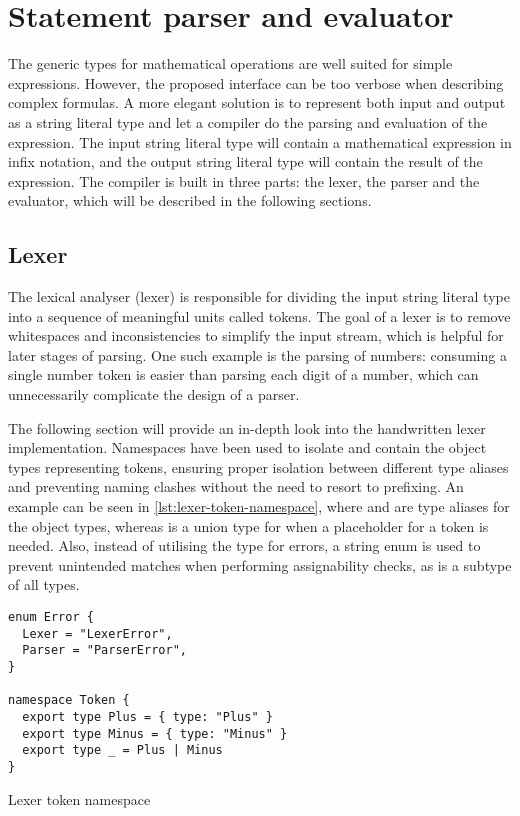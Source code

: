 

\section{Statement parser and evaluator}

The generic types for mathematical operations are well suited for simple expressions. However, the proposed interface can be too verbose when describing complex formulas. A more elegant solution is to represent both input and output as a string literal type and let a compiler do the parsing and evaluation of the expression. The input string literal type will contain a mathematical expression in infix notation, and the output string literal type will contain the result of the expression. The compiler is built in three parts: the lexer, the parser and the evaluator, which will be described in the following sections.

\subsection{Lexer}

The lexical analyser (lexer) is responsible for dividing the input string literal type into a sequence of meaningful units called tokens. The goal of a lexer is to remove whitespaces and inconsistencies to simplify the input stream, which is helpful for later stages of parsing. One such example is the parsing of numbers: consuming a single number token is easier than parsing each digit of a number, which can unnecessarily complicate the design of a parser.

The following section will provide an in-depth look into the handwritten lexer implementation. Namespaces have been used to isolate and contain the object types representing tokens, ensuring proper isolation between different type aliases and preventing naming clashes without the need to resort to prefixing. An example can be seen in \ref{lst:lexer-token-namespace}, where  and  are type aliases for the object types, whereas \vcode{_} is a union type for when a placeholder for a token is needed. Also, instead of utilising the  type for errors, a string enum is used to prevent unintended matches when performing assignability checks, as  is a subtype of all types.

\begin{listing}[ht]
  \begin{verbatim}
enum Error {
  Lexer = "LexerError",
  Parser = "ParserError",
}

namespace Token {
  export type Plus = { type: "Plus" } 
  export type Minus = { type: "Minus" } 
  export type _ = Plus | Minus
} 
\end{verbatim}
  \caption{Lexer token namespace}\label{lst:lexer-token-namespace}
\end{listing}

